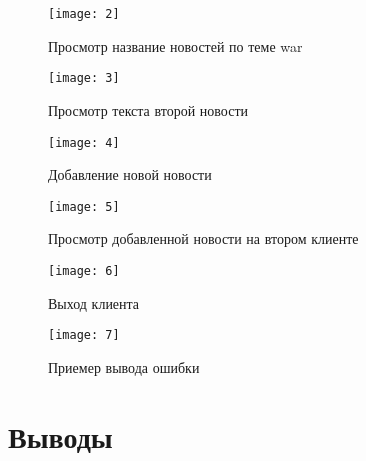 \begin{figure}[H]
	\begin{center}
		\texttt{[image: 2]}
		\caption{Просмотр название новостей по теме war} 
		\label{pic:pic_name} %
	\end{center}
\end{figure}

\begin{figure}[H]
	\begin{center}
		\texttt{[image: 3]}
		\caption{Просмотр текста второй новости} 
		\label{pic:pic_name} %
	\end{center}
\end{figure}

\begin{figure}[H]
	\begin{center}
		\texttt{[image: 4]}
		\caption{Добавление новой новости} 
		\label{pic:pic_name} %
	\end{center}
\end{figure}

\begin{figure}[H]
	\begin{center}
		\texttt{[image: 5]}
		\caption{Просмотр добавленной новости на втором клиенте} 
		\label{pic:pic_name} %
	\end{center}
\end{figure}

\begin{figure}[H]
	\begin{center}
		\texttt{[image: 6]}
		\caption{Выход клиента} 
		\label{pic:pic_name} %
	\end{center}
\end{figure}

\begin{figure}[H]
	\begin{center}
		\texttt{[image: 7]}
		\caption{Приемер вывода ошибки} 
		\label{pic:pic_name} %
	\end{center}
\end{figure}


\section{Выводы}

